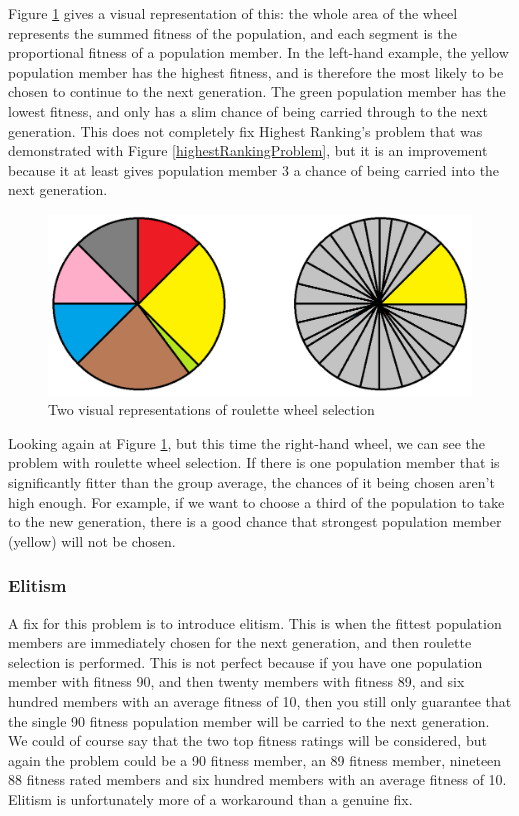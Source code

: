 \documentclass[]{report}
\begin{document}
Figure \ref{rouletteWheel} gives a visual representation of this: the whole area of the wheel represents the summed fitness of the population, and each segment is the proportional fitness of a population member. In the left-hand example, the yellow population member has the highest fitness, and is therefore the most likely to be chosen to continue to the next generation. The green population member has the lowest fitness, and only has a slim chance of being carried through to the next generation. This does not completely fix Highest Ranking's problem that was demonstrated with Figure \ref{highestRankingProblem}, but it is an improvement because it at least gives population member 3 a chance of being carried into the next generation.\\

\begin{figure}
	\centering
	\includegraphics[scale=0.4]{figures/rouletteWheel.png}
	\caption{Two visual representations of roulette wheel selection}
	\label{rouletteWheel}
\end{figure}

Looking again at Figure \ref{rouletteWheel}, but this time the right-hand wheel, we can see the problem with roulette wheel selection. If there is one population member that is significantly fitter than the group average, the chances of it being chosen aren't high enough. For example, if we want to choose a third of the population to take to the new generation, there is a good chance that strongest population member (yellow) will not be chosen.

\subsubsection*{Elitism}

A fix for this problem is to introduce elitism. This is when the fittest population members are immediately chosen for the next generation, and then roulette selection is performed. This is not perfect because if you have one population member with fitness 90, and then twenty members with fitness 89, and six hundred members with an average fitness of 10, then you still only guarantee that the single 90 fitness population member will be carried to the next generation. We could of course say that the two top fitness ratings will be considered, but again the problem could be a 90 fitness member, an 89 fitness member, nineteen 88 fitness rated members and six hundred members with an average fitness of 10. Elitism is unfortunately more of a workaround than a genuine fix.
\end{document}
